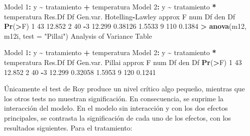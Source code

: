 \documentclass[
  a4paper,
  oneside]{scrbook}
\newenvironment{Shaded}{\begin{snugshade}}{\end{snugshade}}
\newcommand{\AttributeTok}[1]{\textcolor[rgb]{0.13,0.29,0.53}{#1}}
\newcommand{\DecValTok}[1]{\textcolor[rgb]{0.00,0.00,0.81}{#1}}
\newcommand{\FloatTok}[1]{\textcolor[rgb]{0.00,0.00,0.81}{#1}}
\newcommand{\FunctionTok}[1]{\textcolor[rgb]{0.13,0.29,0.53}{\textbf{#1}}}
\newcommand{\NormalTok}[1]{#1}
\newcommand{\SpecialCharTok}[1]{\textcolor[rgb]{0.81,0.36,0.00}{\textbf{#1}}}
\newcommand{\StringTok}[1]{\textcolor[rgb]{0.31,0.60,0.02}{#1}}
\theoremstyle{definition}
\theoremstyle{definition}
\theoremstyle{definition}
\theoremstyle{definition}
\theoremstyle{remark}
\begin{document}
\begin{Shaded}
\begin{Highlighting}[]
\NormalTok{Model }\DecValTok{1}\SpecialCharTok{:}\NormalTok{ y }\SpecialCharTok{\textasciitilde{}}\NormalTok{ tratamiento }\SpecialCharTok{+}\NormalTok{ temperatura}
\NormalTok{Model }\DecValTok{2}\SpecialCharTok{:}\NormalTok{ y }\SpecialCharTok{\textasciitilde{}}\NormalTok{ tratamiento }\SpecialCharTok{*}\NormalTok{ temperatura}
\NormalTok{  Res.Df Df Gen.var. Hotelling}\SpecialCharTok{{-}}\NormalTok{Lawley approx F num Df den Df }\FunctionTok{Pr}\NormalTok{(}\SpecialCharTok{\textgreater{}}\NormalTok{F)}
\DecValTok{1}     \DecValTok{43}      \FloatTok{12.852}                                               
\DecValTok{2}     \DecValTok{40} \SpecialCharTok{{-}}\DecValTok{3}   \FloatTok{12.299}          \FloatTok{0.38126}   \FloatTok{1.5533}      \DecValTok{9}    \DecValTok{110} \FloatTok{0.1384}
\SpecialCharTok{\textgreater{}} \FunctionTok{anova}\NormalTok{(m12, m12i, }\AttributeTok{test =} \StringTok{"Pillai"}\NormalTok{)}
\NormalTok{Analysis of Variance Table}

\NormalTok{Model }\DecValTok{1}\SpecialCharTok{:}\NormalTok{ y }\SpecialCharTok{\textasciitilde{}}\NormalTok{ tratamiento }\SpecialCharTok{+}\NormalTok{ temperatura}
\NormalTok{Model }\DecValTok{2}\SpecialCharTok{:}\NormalTok{ y }\SpecialCharTok{\textasciitilde{}}\NormalTok{ tratamiento }\SpecialCharTok{*}\NormalTok{ temperatura}
\NormalTok{  Res.Df Df Gen.var.  Pillai approx F num Df den Df }\FunctionTok{Pr}\NormalTok{(}\SpecialCharTok{\textgreater{}}\NormalTok{F)}
\DecValTok{1}     \DecValTok{43}      \FloatTok{12.852}                                      
\DecValTok{2}     \DecValTok{40} \SpecialCharTok{{-}}\DecValTok{3}   \FloatTok{12.299} \FloatTok{0.32058}   \FloatTok{1.5953}      \DecValTok{9}    \DecValTok{120} \FloatTok{0.1241}
\end{Highlighting}
\end{Shaded}

\normalsize

Únicamente el test de Roy produce un nivel crítico algo pequeño,
mientras que los otros tests no muestran significación. En consecuencia,
se suprime la interacción del modelo. En el modelo sin interacción y con
los dos efectos principales, se contrasta la significación de cada uno
de los efectos, con los resultados siguientes. Para el tratamiento:

\footnotesize
\end{document}
